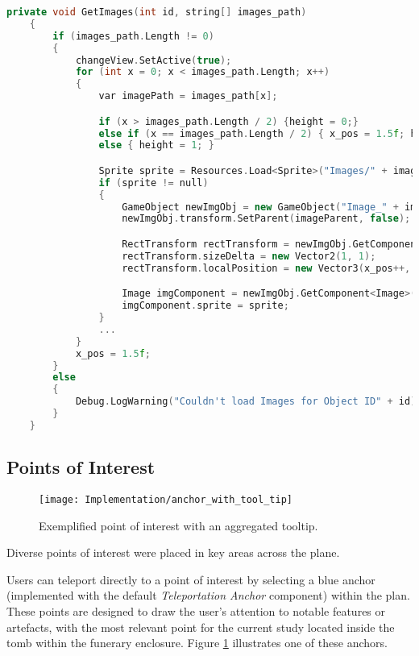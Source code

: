 \begin{lstlisting}[language=C++, caption={Method used to load artefact images and to display them in the Images Gallery.}, label={lst:artefacts_images},float]
      private void GetImages(int id, string[] images_path)
    {
        if (images_path.Length != 0)
        {
            changeView.SetActive(true);
            for (int x = 0; x < images_path.Length; x++)
            {
                var imagePath = images_path[x];

                if (x > images_path.Length / 2) {height = 0;}
                else if (x == images_path.Length / 2) { x_pos = 1.5f; height = 0; }
                else { height = 1; }

                Sprite sprite = Resources.Load<Sprite>("Images/" + imagePath);
                if (sprite != null)
                {
                    GameObject newImgObj = new GameObject("Image_" + imagePath, typeof(RectTransform), typeof(CanvasRenderer), typeof(Image));
                    newImgObj.transform.SetParent(imageParent, false);

                    RectTransform rectTransform = newImgObj.GetComponent<RectTransform>();
                    rectTransform.sizeDelta = new Vector2(1, 1);
                    rectTransform.localPosition = new Vector3(x_pos++, height, 0);

                    Image imgComponent = newImgObj.GetComponent<Image>();
                    imgComponent.sprite = sprite;
                }
                ...
            }
            x_pos = 1.5f;
        }
        else
        {
            Debug.LogWarning("Couldn't load Images for Object ID" + id);
        }
    }
\end{lstlisting}

\subsection{Points of Interest}
\label{sec:points_interest}

\begin{figure}[h!]
    \centering
    \texttt{[image: Implementation/anchor\_with\_tool\_tip]}
    \caption{Exemplified point of interest with an aggregated tooltip.}
    \label{fig:points_interest}
\end{figure}

Diverse points of interest were placed in key areas across the plane.

Users can teleport directly to a point of interest by selecting a blue anchor (implemented with the default \emph{Teleportation Anchor} component) within the plan. These points are designed to draw the user’s attention to notable features or artefacts, with the most relevant point for the current study located inside the tomb within the funerary enclosure.
Figure \ref{fig:points_interest} illustrates one of these anchors.

